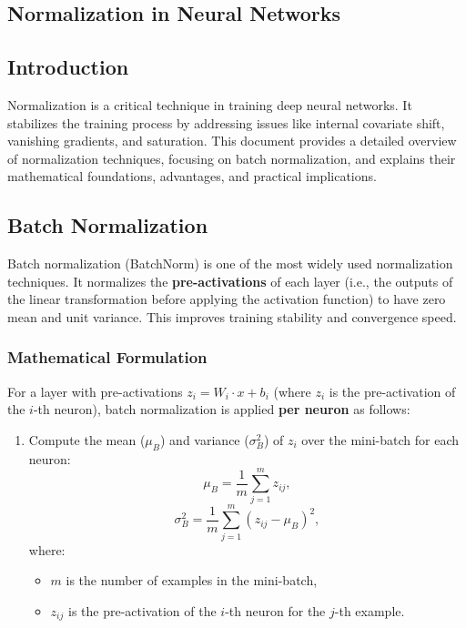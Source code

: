 \begin{notechapter}
\chapter{Normalization in Neural Networks}\label{ch:normalization}

\section{Introduction}
Normalization is a critical technique in training deep neural networks.
It stabilizes the training process by addressing issues like internal
covariate shift, vanishing gradients, and saturation. This document
provides a detailed overview of normalization techniques, focusing on
batch normalization, and explains their mathematical foundations,
advantages, and practical implications.

\section{Batch Normalization}
Batch normalization (BatchNorm) is one of the most widely used
normalization techniques. It normalizes the \textbf{pre-activations}
of each layer (i.e., the outputs of the linear transformation before
applying the activation function) to have zero mean and unit variance.
This improves training stability and convergence speed.

\subsection{Mathematical Formulation}
For a layer with pre-activations \(z_i = W_i \cdot x + b_i\) (where \(z_i\)
is the pre-activation of the \(i\)-th neuron), batch normalization
is applied \textbf{per neuron} as follows:

\begin{enumerate}[leftmargin=*]
    \item Compute the mean (\(\mu_B\)) and variance (\(\sigma_B^2\)) of \(z_i\)
    over the mini-batch for each neuron:
    \[
    \mu_B = \frac{1}{m} \sum_{j=1}^m z_{ij},
    \]
    \[
    \sigma_B^2 = \frac{1}{m} \sum_{j=1}^m (z_{ij} - \mu_B)^2,
    \]
    where:
    \begin{itemize}
        \item \(m\) is the number of examples in the mini-batch,
        \item \(z_{ij}\) is the pre-activation of the \(i\)-th neuron for the \(j\)-th example.
    \end{itemize}


\end{enumerate}
\end{notechapter}
